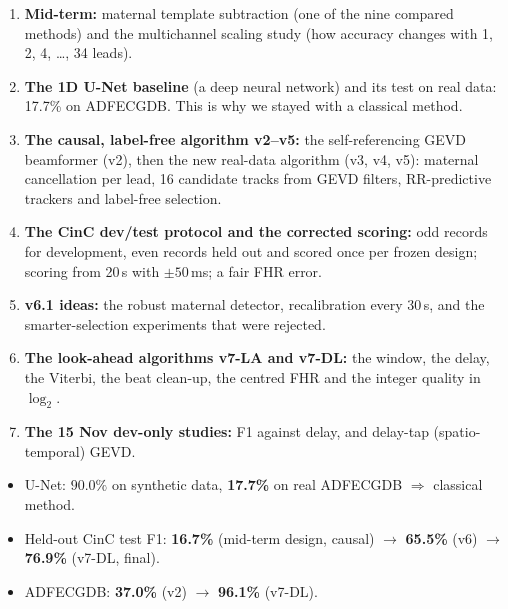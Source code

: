 \documentclass[11pt]{article}
\begin{document}
\begin{enumerate}
  \item \textbf{Mid-term:} maternal template subtraction (one of the nine compared methods) and the multichannel scaling study (how accuracy changes with 1, 2, 4, \dots, 34 leads).
  \item \textbf{The 1D U-Net baseline} (a deep neural network) and its test on real data: 17.7\% on ADFECGDB. This is why we stayed with a classical method.
  \item \textbf{The causal, label-free algorithm v2--v5:} the self-referencing GEVD beamformer (v2), then the new real-data algorithm (v3, v4, v5): maternal cancellation per lead, 16 candidate tracks from GEVD filters, RR-predictive trackers and label-free selection.
  \item \textbf{The CinC dev/test protocol and the corrected scoring:} odd records for development, even records held out and scored once per frozen design; scoring from 20\,s with $\pm 50$\,ms; a fair FHR error.
  \item \textbf{v6.1 ideas:} the robust maternal detector, recalibration every 30\,s, and the smarter-selection experiments that were rejected.
  \item \textbf{The look-ahead algorithms v7-LA and v7-DL:} the window, the delay, the Viterbi, the beat clean-up, the centred FHR and the integer quality in $\log_2$.
  \item \textbf{The 15 Nov dev-only studies:} F1 against delay, and delay-tap (spatio-temporal) GEVD.
\end{enumerate}

\begin{keyfact}
\begin{itemize}
  \item U-Net: $90.0\%$ on synthetic data, \textbf{17.7\%} on real ADFECGDB $\Rightarrow$ classical method.
  \item Held-out CinC test F1: \textbf{16.7\%} (mid-term design, causal) $\to$ \textbf{65.5\%} (v6) $\to$ \textbf{76.9\%} (v7-DL, final).
  \item ADFECGDB: \textbf{37.0\%} (v2) $\to$ \textbf{96.1\%} (v7-DL).
\end{itemize}
\end{keyfact}
\end{document}

